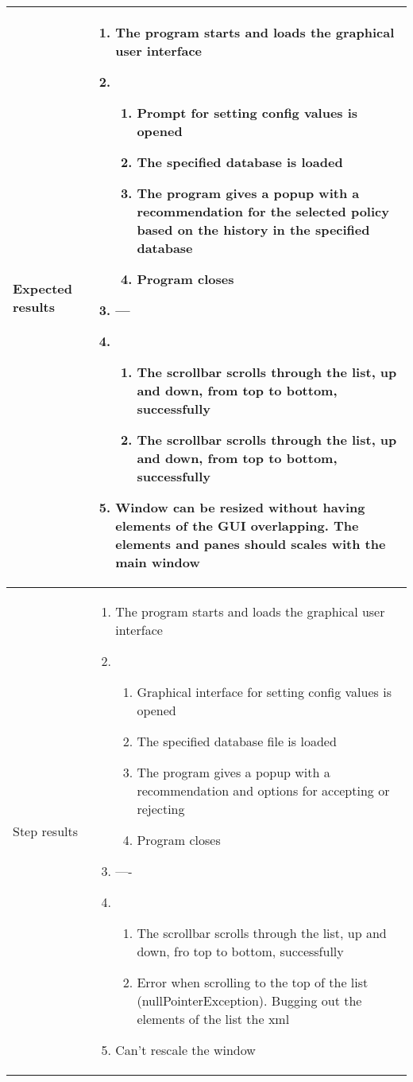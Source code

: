 \documentclass[a4paper]{article}
\begin{document}
\begin{center}
\begin{tabular}{ |  p{3cm} | p{7cm} | }
			Expected results &	\begin{enumerate}
							\item The program starts and loads the graphical user interface
							\item  
							\begin{enumerate}
								\item Prompt for setting config values is opened
								\item The specified database is loaded
								\item The program gives a popup with a recommendation for the selected policy based on the history in the specified database
								\item Program closes
							\end{enumerate}
							\item ---
							\item 
							\begin{enumerate}
								\item The scrollbar scrolls through the list, up and down, from top to bottom, successfully
								\item The scrollbar scrolls through the list, up and down, from top to bottom, successfully
							\end{enumerate}
							\item Window can be resized without having elements of the GUI overlapping. The elements and panes should scales with the main window
						\end{enumerate}
							 \\  [5pt] \hline

			Step results & 	\begin{enumerate}
							\item The program starts and loads the graphical user interface
							\item 
							\begin{enumerate}
								\item Graphical interface for setting config values is opened
								\item The specified database file is loaded
								\item The program gives a popup with a recommendation and options for accepting or rejecting
								\item Program closes
							\end{enumerate}
							\item ----
							\item  
							\begin{enumerate}
								\item The scrollbar scrolls through the list, up and down, fro top to bottom, successfully
								\item Error when scrolling to the top of the list (nullPointerException). Bugging out the elements of the list the xml
							\end{enumerate}
							\item Can't rescale the window
						\end{enumerate}
							 \\  [5pt] \hline


\end{tabular}
\end{center}
\end{document}
